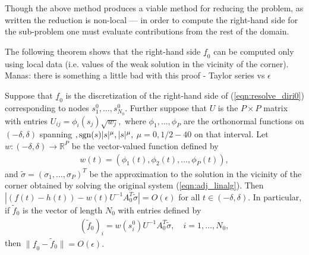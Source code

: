 \begin{remark}
Though the above method produces a viable method for reducing the problem, as written the reduction is non-local --- in order to compute the right-hand side for the sub-problem one must evaluate contributions from the rest of the domain.
\end{remark}

The following theorem shows that the right-hand side $\underline{f}_0$ can be computed only using local data (i.e. values of the weak solution in the vicinity of the corner).\\
{\color{red} Manas: there is something a little bad with this proof - Taylor series vs $\epsilon$}
\begin{theorem}
Suppose that $\underline{f}_0$ is the discretization of the right-hand side of (\ref{eqn:resolve_diri0}) corresponding to nodes $s^0_1,\dots,s^0_{N_0}.$ Further suppose that $U$ is the $P\times P$ matrix with entries $U_{ij} = \phi_i(s_j) \sqrt{w_j},$ where $\phi_1,\dots,\phi_P$ are the orthonormal functions on $(-\delta,\delta)$ spanning $,{\rm sgn}(s)|s|^\mu, |s|^\mu,$ $\mu=0,1/2-40$ on that interval. Let $w:(-\delta,\delta) \to \mathbb{R}^P$ be the vector-valued function defined by
\begin{align}
w(t) = (\phi_1(t),\phi_2(t),\dots,\phi_P(t)),
\end{align}
and $\tilde{\sigma} = (\sigma_1,\dots,\sigma_P)^T$ be the approximation to the solution in the vicinity of the corner obtained by solving the original system (\ref{eqn:adj_linalg}). Then $|(f(t)-h(t)) - w(t) U^{-1} A_0^T \tilde{\sigma}| = O(\epsilon)$ for all $t \in(-\delta,\delta).$ In particular, if $\tilde{f}_0$ is the vector of length $N_0$ with entries defined by
\begin{align}
(\tilde{f}_0)_i = w(s^0_i) U^{-1} A_0^T \tilde{\sigma}, \quad i=1,\dots,N_0,
\end{align}
then $\| \underline{f}_0 - \tilde{f}_0\| = O(\epsilon).$
\end{theorem}
